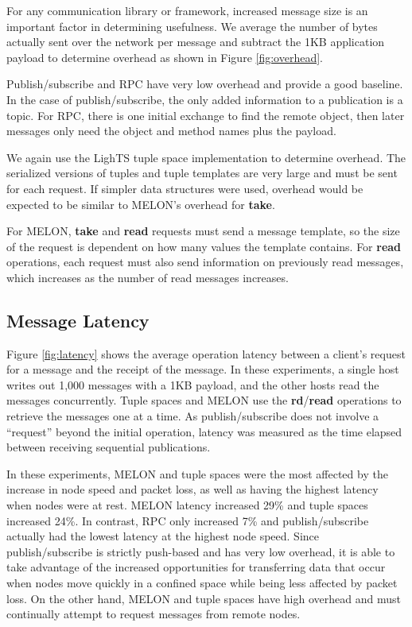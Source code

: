\documentclass[lnicst]{svmultln}
\begin{document}
For any communication library or framework, increased message size is an important factor in determining usefulness. We average the number of bytes actually sent over the network per message and subtract the 1KB application payload to determine overhead as shown in Figure \ref{fig:overhead}.

Publish/subscribe and RPC have very low overhead and provide a good baseline. In the case of publish/subscribe, the only added information to a publication is a topic. For RPC, there is one initial exchange to find the remote object, then later messages only need the object and method names plus the payload.

We again use the LighTS tuple space implementation to determine overhead. The serialized versions of tuples and tuple templates are very large and must be sent for each request. If simpler data structures were used, overhead would be expected to be similar to MELON's overhead for \textbf{take}.

For MELON, \textbf{take} and \textbf{read} requests must send a message template, so the size of the request is dependent on how many values the template contains. For \textbf{read} operations, each request must also send information on previously read messages, which increases as the number of read messages increases.

\subsection{Message Latency}

Figure \ref{fig:latency} shows the average operation latency between a client's request for a message and the receipt of the message. In these experiments, a single host writes out 1,000 messages with a 1KB payload, and the other hosts read the messages concurrently. Tuple spaces and MELON use the \textbf{rd}/\textbf{read} operations to retrieve the messages one at a time. As publish/subscribe does not involve a ``request'' beyond the initial operation, latency was measured as the time elapsed between receiving sequential publications.

In these experiments, MELON and tuple spaces were the most affected by the increase in node speed and packet loss, as well as having the highest latency when nodes were at rest. MELON latency increased 29\% and tuple spaces increased 24\%. In contrast, RPC only increased 7\% and publish/subscribe actually had the lowest latency at the highest node speed. Since publish/subscribe is strictly push-based and has very low overhead, it is able to take advantage of the increased opportunities for transferring data that occur when nodes move quickly in a confined space while being less affected by packet loss. On the other hand, MELON and tuple spaces have high overhead and must continually attempt to request messages from remote nodes.
\end{document}
